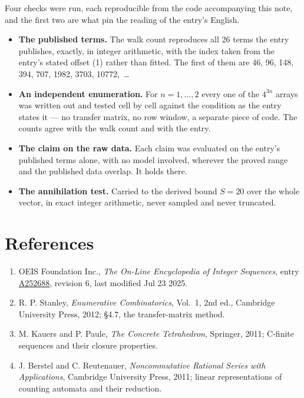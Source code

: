 \documentclass[11pt]{article}
\theoremstyle{definition}
\begin{document}
Four checks were run, each reproducible from the code accompanying this note, and the first two are what pin the reading of the entry's English.

\begin{itemize}

\item {\bfseries The published terms.} The walk count reproduces all 26 terms the entry publishes, exactly, in integer arithmetic, with the index taken from the entry's stated offset (1) rather than fitted. The first of them are 46, 96, 148, 394, 707, 1982, 3703, 10772,~\dots

\item {\bfseries An independent enumeration.} For $n = 1,\dots,2$ every one of the $4^{3n}$ arrays was written out and tested cell by cell against the condition as the entry states it --- no transfer matrix, no row window, a separate piece of code. The counts agree with the walk count and with the entry.

\item {\bfseries The claim on the raw data.} Each claim was evaluated on the entry's published terms alone, with no model involved, wherever the proved range and the published data overlap. It holds there.

\item {\bfseries The annihilation test.} Carried to the derived bound $S = 20$ over the whole vector, in exact integer arithmetic, never sampled and never truncated.

\end{itemize}

\section{References}

\begin{enumerate}

\item OEIS Foundation Inc., \emph{The On-Line Encyclopedia of Integer Sequences}, entry \href{https://oeis.org/A252688}{A252688}, revision 6, last modified Jul 23 2025.

\item R. P. Stanley, \emph{Enumerative Combinatorics}, Vol.~1, 2nd ed., Cambridge University Press, 2012; \S4.7, the transfer-matrix method.

\item M. Kauers and P. Paule, \emph{The Concrete Tetrahedron}, Springer, 2011; C-finite sequences and their closure properties.

\item J. Berstel and C. Reutenauer, \emph{Noncommutative Rational Series with Applications}, Cambridge University Press, 2011; linear representations of counting automata and their reduction.

\end{enumerate}
\end{document}
